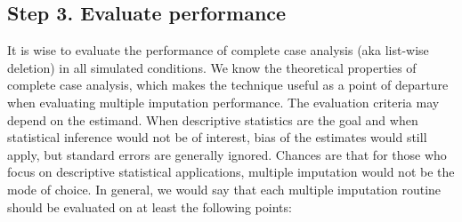 \documentclass[bimj,fleqn]{w-art}
\theoremstyle{plain}
\theoremstyle{definition}
\begin{document}
\subsection{Step 3. Evaluate performance}

It is wise to evaluate the performance of complete case analysis (aka list-wise deletion) in all simulated conditions. We know the theoretical properties of complete case analysis, which makes the technique useful as a point of departure when evaluating multiple imputation performance. 
The evaluation criteria may depend on the estimand. When descriptive statistics are the goal and when statistical inference would not be of interest, bias of the estimates would still apply, but standard errors are generally ignored. Chances are that for those who focus on descriptive statistical applications, multiple imputation would not be the mode of choice. In general, we would say that each multiple imputation routine should be evaluated on at least the following points:
\end{document}
